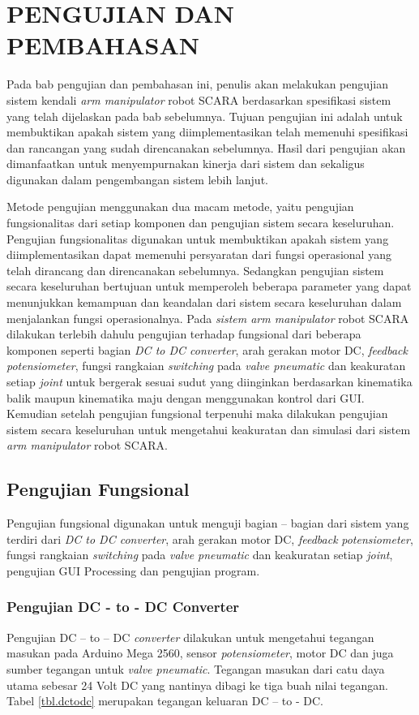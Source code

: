 
\chapter{PENGUJIAN DAN PEMBAHASAN}
Pada bab pengujian dan pembahasan ini, penulis akan melakukan pengujian sistem kendali\textit{ arm manipulator} robot SCARA berdasarkan spesifikasi sistem yang telah dijelaskan pada bab sebelumnya. Tujuan pengujian ini adalah untuk membuktikan apakah sistem yang diimplementasikan telah memenuhi spesifikasi dan rancangan yang sudah direncanakan sebelumnya. Hasil dari pengujian akan dimanfaatkan untuk menyempurnakan kinerja dari sistem dan sekaligus digunakan dalam pengembangan sistem lebih lanjut. 

Metode pengujian menggunakan dua macam metode, yaitu pengujian fungsionalitas dari setiap komponen dan pengujian sistem secara keseluruhan. Pengujian fungsionalitas digunakan untuk membuktikan apakah sistem yang diimplementasikan dapat memenuhi persyaratan dari fungsi operasional yang telah dirancang dan direncanakan sebelumnya. Sedangkan pengujian sistem secara keseluruhan bertujuan untuk memperoleh beberapa parameter yang dapat menunjukkan kemampuan dan keandalan dari sistem secara keseluruhan dalam menjalankan fungsi operasionalnya. Pada \textit{sistem arm manipulator} robot SCARA dilakukan terlebih dahulu pengujian terhadap fungsional dari beberapa komponen seperti bagian \textit{DC to DC converter}, arah gerakan motor DC, \textit{feedback} \textit{potensiometer}, fungsi rangkaian \textit{switching} pada \textit{valve pneumatic} dan keakuratan setiap \textit{joint} untuk bergerak sesuai sudut yang diinginkan berdasarkan kinematika balik maupun kinematika maju dengan menggunakan kontrol dari GUI.  Kemudian setelah pengujian fungsional terpenuhi maka dilakukan pengujian sistem secara keseluruhan untuk mengetahui keakuratan dan simulasi dari sistem \textit{arm manipulator} robot SCARA.

\section{Pengujian Fungsional}
Pengujian fungsional digunakan untuk menguji bagian – bagian dari sistem yang terdiri dari \textit{DC to DC converter}, arah gerakan motor DC, \textit{feedback} \textit{potensiometer}, fungsi rangkaian \textit{switching} pada \textit{valve pneumatic} dan keakuratan setiap \textit{joint}, pengujian GUI Processing dan pengujian program. 

\subsection{Pengujian DC - to - DC Converter}
Pengujian DC – to – DC \textit{converter} dilakukan untuk mengetahui tegangan masukan pada Arduino Mega 2560, sensor \textit{potensiometer}, motor DC dan juga sumber tegangan untuk\textit{ valve pneumatic}. Tegangan masukan dari catu daya utama sebesar 24 Volt DC yang nantinya dibagi ke tiga buah nilai tegangan. Tabel \ref{tbl.dctodc} merupakan tegangan keluaran DC – to - DC.

